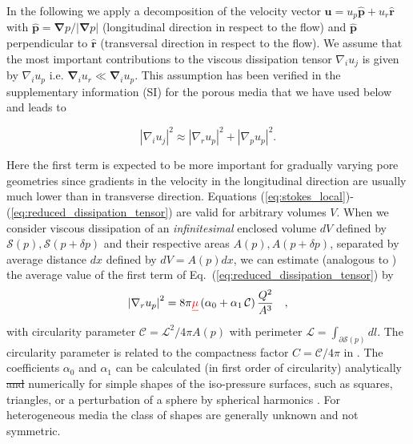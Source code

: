 \documentclass[draft]{agujournal2019}
\providecommand{\DIFadd}[1]{{\protect\color{blue}\uwave{#1}}} %
\providecommand{\DIFdel}[1]{{\protect\color{red}\sout{#1}}}                      %
\providecommand{\DIFaddbegin}{} %
\providecommand{\DIFaddend}{} %
\providecommand{\DIFdelbegin}{} %
\providecommand{\DIFdelend}{} %
\begin{document}
In the following we apply a decomposition of the velocity vector $\mathbf{u} = u_p \mathbf{\hat{p}} + u_r \mathbf{\hat{r}}$ with $\mathbf{\hat{p}} =\mathbf{ \nabla}p/|\mathbf{ \nabla}p|$ (longitudinal direction in respect to the flow) and $\hat{\mathbf{p}}$ perpendicular to $\hat{\mathbf{r}}$ (transversal direction in respect to the flow). We assume that the most important contributions to the viscous dissipation tensor $\nabla_i u_j$ is given by $\nabla_i u_p$ i.e. $\mathbf{\nabla}_i u_r \ll \mathbf{\nabla}_i u_p $. This assumption has been verified in the supplementary information (SI) for the porous media that we have used below and leads to 
\DIFdelbegin %

\DIFdelend \begin{equation}
\left|\nabla_i u_j\right|^2 \approx  \left|\nabla_r u_p\right|^2 + \left|\nabla_p u_p\right|^2 .\label{eq:reduced_dissipation_tensor}
\end{equation}
\DIFdelbegin %

\DIFdelend Here the first term is expected to be more important for gradually varying pore geometries since gradients in the velocity in the longitudinal direction are usually much lower than in transverse direction. Equations (\ref{eq:stokes_local})-(\ref{eq:reduced_dissipation_tensor}) are valid for arbitrary volumes $V$. When we consider viscous dissipation of an \textit{infinitesimal} enclosed volume $dV$ defined by $\mathcal{S}(p),\mathcal{S}(p+\delta p)$ and their respective areas $A(p), A(p+\delta p)$, separated by average distance $dx$ defined by $dV = A(p)dx$, we can estimate (analogous to ) the average value of the first term of Eq.~(\ref{eq:reduced_dissipation_tensor}) by
\begin{equation}
	\left|\nabla_r u_p\right|^2 =8\pi \DIFdelbegin \DIFdel{\mu }\DIFdelend \left(\alpha_0+\alpha_1\,\mathcal{C}\right)\frac{ Q^2}{A^3}~~~ ,\label{eq:tau_1}
\end{equation}
with circularity parameter $\mathcal{C} = \mathcal{L}^2/4\pi A(p)$ with perimeter $\mathcal{L} = \int_{\partial \mathcal{S}(p)}dl$. The circularity parameter is related to the compactness factor $C = \mathcal{C}/4\pi$ in \cite{mortensen_reexamination_2005}\DIFaddbegin \DIFadd{, and for HP flow equal to one}\DIFaddend . The coefficients $\alpha_0$ and $\alpha_1$ can be calculated (in first order of circularity) analytically \DIFdelbegin \DIFdel{and }\DIFdelend \DIFaddbegin \DIFadd{or }\DIFaddend numerically for simple shapes of the iso-pressure surfaces, such as squares, triangles, or a perturbation of a sphere by spherical harmonics \cite{mortensen_reexamination_2005}. For heterogeneous media the class of shapes are generally unknown and not symmetric. 
\end{document}

